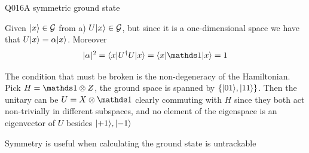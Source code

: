 \begin{entry}{Q016}{A symmetric ground state}
\begin{solution}[Part (b)]
Given $\lvert x \rangle \in \mathcal G$ from a) $U\lvert x \rangle \in \mathcal{ G}$, but since it is a one-dimensional space we have that $U\lvert x \rangle = \alpha\lvert x \rangle$. Moreover 
\begin{equation}
    |\alpha|^2 = \avg{x}{U^\dagger U}{x} =\avg{x}{\id}{x}=1
\end{equation}
\end{solution}

\begin{solution}[Part (c)]
The condition that must be broken is the non-degeneracy of the Hamiltonian. Pick $H=\id \otimes Z$, the ground space is spanned by $\{\lvert 01 \rangle,\lvert 11 \rangle\}$. Then the unitary can be $U=X\otimes \id$ clearly commuting with $H$ since they both act non-trivially in different subspaces, and no element of the eigenspace is an eigenvector of $U$ besides $\lvert +1 \rangle,\lvert -1 \rangle$
\end{solution}

\begin{takeaway}
Symmetry is useful when calculating the ground state is untrackable 
\end{takeaway}


\end{entry}